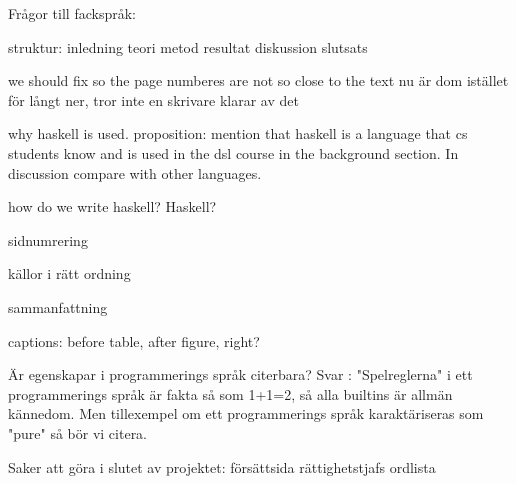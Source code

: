 Frågor till fackspråk:



struktur:
inledning
teori
metod
resultat
diskussion
slutsats



we should fix so the page numberes are not so close to the text nu är dom istället för långt ner, tror inte en skrivare klarar av det

why haskell is used.
proposition: mention that haskell is a language that cs students know and is used in the dsl course in the background section. In discussion compare with other languages.

how do we write haskell? Haskell?


sidnumrering

källor i rätt ordning

sammanfattning

captions: before table, after figure, right? 

Är egenskapar i programmerings språk citerbara?
Svar : "Spelreglerna" i ett programmerings språk är fakta så som 1+1=2, så alla builtins är allmän kännedom. Men tillexempel om ett programmerings språk karaktäriseras som "pure" så bör vi citera. 

Saker att göra i slutet av projektet:
försättsida
rättighetstjafs
ordlista

